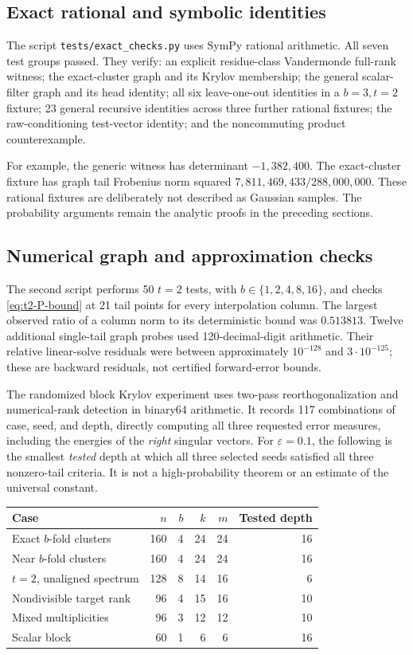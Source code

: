 \documentclass[11pt]{article}
\theoremstyle{definition}
\begin{document}
\subsection{Exact rational and symbolic identities}

The script \texttt{tests/exact\_checks.py} uses SymPy rational arithmetic.
All seven test groups passed. They verify: an explicit residue-class
Vandermonde full-rank witness; the exact-cluster graph and its Krylov
membership; the general scalar-filter graph and its head identity;
all six leave-one-out identities in a $b=3,t=2$ fixture;
23 general recursive identities across three further rational fixtures;
the raw-conditioning test-vector identity; and the noncommuting product
counterexample.

For example, the generic witness has determinant $-1{,}382{,}400$.
The exact-cluster fixture has graph tail Frobenius norm squared
$7{,}811{,}469{,}433/288{,}000{,}000$.
These rational fixtures are deliberately not described as Gaussian samples.
The probability arguments remain the analytic proofs in the preceding sections.

\subsection{Numerical graph and approximation checks}

The second script performs 50 $t=2$ tests, with $b\in\{1,2,4,8,16\}$,
and checks \eqref{eq:t2-P-bound} at 21 tail points for every interpolation
column. The largest observed ratio of a column norm to its deterministic
bound was $0.513813$. Twelve additional single-tail graph probes used
120-decimal-digit arithmetic. Their relative linear-solve residuals were
between approximately $10^{-128}$ and $3\cdot10^{-125}$; these are backward
residuals, not certified forward-error bounds.

The randomized block Krylov experiment uses two-pass reorthogonalization
and numerical-rank detection in binary64 arithmetic. It records 117
combinations of case, seed, and depth, directly computing all three requested
error measures, including the energies of the \emph{right} singular vectors.
For $\varepsilon=0.1$, the following is the smallest \emph{tested} depth at
which all three selected seeds satisfied all three nonzero-tail criteria.
It is not a high-probability theorem or an estimate of the universal constant.

\begin{center}
\small
\begin{tabular}{lrrrrr}
\toprule
Case & $n$ & $b$ & $k$ & $m$ & Tested depth\\
\midrule
Exact $b$-fold clusters &160&4&24&24&16\\
Near $b$-fold clusters &160&4&24&24&16\\
$t=2$, unaligned spectrum &128&8&14&16&6\\
Nondivisible target rank &96&4&15&16&10\\
Mixed multiplicities &96&3&12&12&10\\
Scalar block &60&1&6&6&16\\
\bottomrule
\end{tabular}
\end{center}
\end{document}

